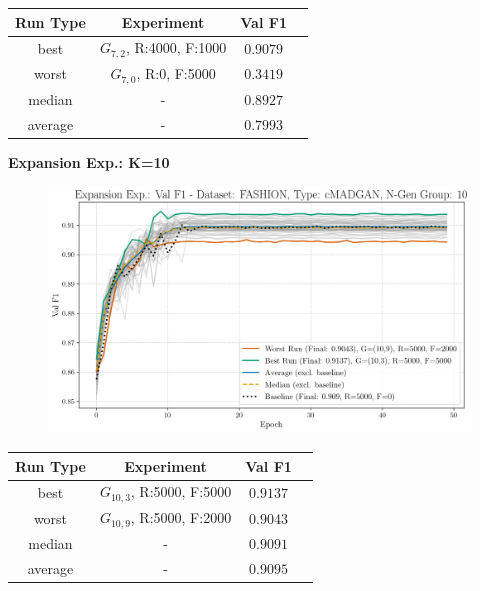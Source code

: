 \begin{table}[H]
	\vspace{-1em}
	\centering
	\begin{tabular}{|c|c|c|c|}
		\hline
		Run Type & Experiment & Val F1 \\ \hline
		best & \(G_{7, 2}\), R:4000, F:1000 & $0.9079$\\ \hline
		worst & \(G_{7, 0}\), R:0, F:5000 & $0.3419$\\ \hline
		median & - & $0.8927$\\ \hline
		average & - & $0.7993$
		\\ \hline
	\end{tabular}
\end{table}
\newpage
\noindent\textbf{Expansion Exp.: K=10}
\begin{figure}[htbp]
	\centering
	\includegraphics[width=.85\textwidth]{abb/strat_classifier_performance/FASHION_STRATIFIED_CLASSIFIERS_cMADGAN_NEW/expansion_experiments/val_f1_score_cMADGAN_FASHION_n_gen_10_all.png}
	\label{fig:app_strat_class_performance_expansion_exp._val_f1_score_10}
\end{figure}
\begin{table}[H]
	\vspace{-1em}
	\centering
	\begin{tabular}{|c|c|c|c|}
		\hline
		Run Type & Experiment & Val F1 \\ \hline
		best & \(G_{10, 3}\), R:5000, F:5000 & $0.9137$\\ \hline
		worst & \(G_{10, 9}\), R:5000, F:2000 & $0.9043$\\ \hline
		median & - & $0.9091$\\ \hline
		average & - & $0.9095$
		\\ \hline
	\end{tabular}
\end{table}
